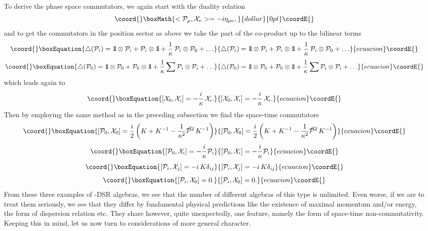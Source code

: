 \documentclass [prd,twocolumn,nofootinbib,showpacs]  {revtex4}
\def\bbbone{{\mathchoice {\rm 1\mskip-4mu l} {\rm 1\mskip-4mu l}
{\rm 1\mskip-4.5mu l} {\rm 1\mskip-5mu l}}}
\begin{document}
To derive the phase space commutators, we again start with the duality relation
$$\coord{}\boxMath{
 <{\cal P}_\mu, {\cal X}_\nu> =  -i \eta_{\mu\nu},
}{dollar}{0pt}\coordE{}$$
and to get the commutators in the position sector as above we take
 the part of the co-product up to the bilinear terms
\begin{equation}\coord{}\boxEquation{\label{cpcb1}
  \triangle({\cal P}_{i})=\bbbone \otimes {\cal P}_{i} + {\cal P}_{i} \otimes \bbbone +
   {\frac{1}{\kappa}}\, {\cal P}_{i} \otimes {\cal P}_{0} + \ldots
}{\triangle({\cal P}_{i})=\bbbone \otimes {\cal P}_{i} + {\cal P}_{i} \otimes \bbbone +
   {\frac{1}{\kappa}}\, {\cal P}_{i} \otimes {\cal P}_{0} + \ldots
}{ecuacion}\coordE{}\end{equation}
\begin{equation}\coord{}\boxEquation{\label{cpcb2}
  \triangle({\cal P}_{0})= \bbbone \otimes {\cal P}_{0} + {\cal P}_{0} \otimes \bbbone +
  \frac{1}{\kappa}\sum {\cal P}_{i}\otimes {\cal P}_{i}+ \ldots
}{\triangle({\cal P}_{0})= \bbbone \otimes {\cal P}_{0} + {\cal P}_{0} \otimes \bbbone +
  \frac{1}{\kappa}\sum {\cal P}_{i}\otimes {\cal P}_{i}+ \ldots
}{ecuacion}\coordE{}\end{equation}
which leads again to
\begin{equation}\coord{}\boxEquation{\label{21}
  [{\cal X}_0, {\cal X}_i] = -\frac{i}\kappa\, {\cal X}_i.
}{[{\cal X}_0, {\cal X}_i] = -\frac{i}\kappa\, {\cal X}_i.
}{ecuacion}\coordE{}\end{equation}
Then by employing the same method as in the preceding subsection
we find the space-time commutators
\begin{equation}\coord{}\boxEquation{\label{22a}
 [{\cal P}_0, {\cal X}_0] = \frac{i}2\left(K + K^{-1}- \frac1{\kappa^2}\vec{{\cal
    P}}{}^2\, K^{-1}\right)
}{[{\cal P}_0, {\cal X}_0] = \frac{i}2\left(K + K^{-1}- \frac1{\kappa^2}\vec{{\cal
    P}}{}^2\, K^{-1}\right)
}{ecuacion}\coordE{}\end{equation}
\begin{equation}\coord{}\boxEquation{\label{22b}
 [{\cal P}_0, {\cal X}_i] =  -\frac{i}\kappa {\cal P}_i
}{[{\cal P}_0, {\cal X}_i] =  -\frac{i}\kappa {\cal P}_i
}{ecuacion}\coordE{}\end{equation}
\begin{equation}\coord{}\boxEquation{\label{22c}
  [{\cal P}_i, {\cal X}_j] = - i \, K\delta_{ij}
}{[{\cal P}_i, {\cal X}_j] = - i \, K\delta_{ij}
}{ecuacion}\coordE{}\end{equation}
\begin{equation}\coord{}\boxEquation{\label{22d}
 [{\cal P}_i, {\cal X}_0] = 0.
}{[{\cal P}_i, {\cal X}_0] = 0.
}{ecuacion}\coordE{}\end{equation}
From these three examples of \myHighlight{$\kappa$}\coordHE{}-DSR algebras, we see that
the number of different  algebras of this type is unlimited. Even
worse, if we are to treat them seriously, we see that they differ
by fundamental physical predictions like the existence of maximal
momentum and/or energy, the form of dispersion relation etc. They
share however, quite unexpectedly, one feature, namely the form of
space-time non-commutativity. Keeping this in mind, let us now
turn to considerations of more general character.
\end{document}
